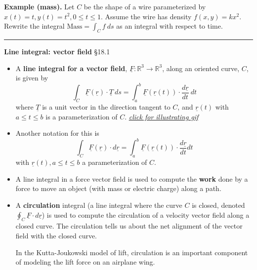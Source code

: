 \documentclass[12pt,letterpaper,noanswers]{exam}
\newcommand{\mb}[1]{\underline{#1}}
\begin{document}
\noindent\textbf{Example (mass).} 
Let $C$ be the shape of a wire parameterized by $x(t) = t, y(t) = t^2, 0\leq t\leq 1$.  Assume the wire has density $f(x,y) = k x^2$.  Rewrite the integral $\displaystyle\text{Mass} = \int_C f \ ds$ as an integral with respect to time.

\vspace{3in}

\vspace{0.2cm}
\hrule
\vspace{0.2cm}

\noindent\textbf{Line integral: vector field} \S 18.1
\begin{tcolorbox}
\begin{itemize}
\itemsep0em
    \item A \textbf{line integral for a vector field}, $\mb F:\mathbb{R}^3 \rightarrow \mathbb{R}^3$, along an oriented curve, $C$, is given by \[\int_C \mb F(\mb r)\cdot \mb T\ ds = \int_a^b \mb F(\mb r(t))\cdot \frac{d\mb r}{dt}\ dt\] where $\mb T$ is a unit vector in the direction tangent to $C$, and $\mb r(t)$ with $a\leq t\leq b$ is a parameterization of $C$. \href{https://upload.wikimedia.org/wikipedia/commons/b/b0/Line_integral_of_vector_field.gif}{\emph{click for illustrating gif}}
    \item Another notation for this is \[\int_C \mb F(\mb r)\cdot d\mb r = \int_a^b \mb F(\mb r(t)) \cdot \frac{d\mb r}{dt}dt\] with $\mb r(t), a\leq t\leq b$ a parameterization of $C$.
\end{itemize}



\tcblower

\begin{itemize}
\itemsep0em
    \item A line integral in a force vector field is used to compute the \textbf{work} done by a force to move an object (with mass or electric charge) along a path.

\item A \textbf{circulation} integral (a line integral where the curve $C$ is closed, denoted $\oint_C \mb F\cdot d\mb r$) is used to compute the circulation of a velocity vector field along a closed curve.  The circulation tells us about the net alignment of the vector field with the closed curve.

In the Kutta-Joukowski model of lift, circulation is an important component of modeling the lift force on an airplane wing.
\end{itemize}
\end{tcolorbox}
\end{document}
